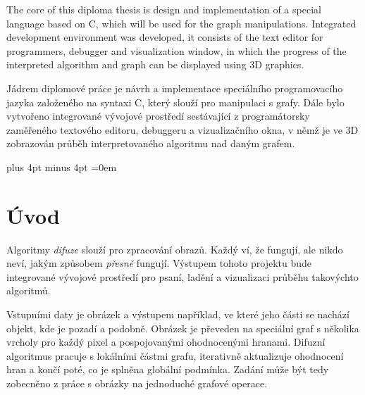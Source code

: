 \documentclass[11pt,twoside,a4paper]{book}
\begin{document}
\abstractpage
The core of this diploma thesis is design and implementation of a special language based on C, which will be used for the graph manipulations. Integrated development environment was developed, it consists of the text editor for programmers, debugger and visualization window, in which the progress of the interpreted algorithm and graph can be displayed using 3D graphics.


\vspace{8ex}

\noindent
Jádrem diplomové práce je návrh a implementace speciálního programovacího jazyka založeného na syntaxi C, který slouží pro manipulaci s grafy. Dále bylo vytvořeno integrované vývojové prostředí sestávající z programátorsky zaměřeného textového editoru, debuggeru a vizualizačního okna, v němž je ve 3D zobrazován průběh interpretovaného algoritmu nad daným grafem.



\tableofcontents
\listoffigures
\listoftables



\mainbodystarts

\parskip=5pt plus 4pt minus 4pt
\parindent=0em



\chapter{Úvod}

Algoritmy \textit{difuze} slouží pro zpracování obrazů. Každý ví, že fungují, ale nikdo neví, jakým způsobem \textit{přesně} fungují. Výstupem tohoto projektu bude integrované vývojové prostředí pro psaní, ladění a vizualizaci průběhu takovýchto algoritmů.

Vstupními daty je obrázek a výstupem například, ve které jeho části se nachází objekt, kde je pozadí a podobně. Obrázek je převeden na speciální graf s několika vrcholy pro každý pixel a pospojovanými ohodnocenými hranami. Difuzní algoritmus pracuje s lokálními částmi grafu, iterativně aktualizuje ohodnocení hran a končí poté, co je splněna globální podmínka. Zadání může být tedy zobecněno z práce s obrázky na jednoduché grafové operace.
\end{document}
